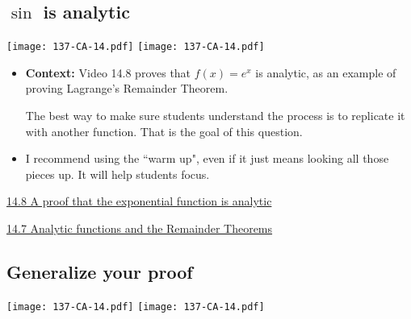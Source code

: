 \documentclass[11pt]{article}
\newcommand{\nl}{\hfill \vspace{-1.1\baselineskip}} %
\newcommand{\vvii}{\hspace{8mm}  \href{https://www.youtube.com/watch?v=SXLJOa1_GMs&list=PLlwePzQY_wW9h32ZwS6CYsY4eR_b2pE9j&index=7}{14.7 Analytic functions and the Remainder Theorems}}
\newcommand{\vviii}{\hspace{8mm}  \href{https://www.youtube.com/watch?v=lQH-pqS7vdk&list=PLlwePzQY_wW9h32ZwS6CYsY4eR_b2pE9j&index=8}{14.8 A proof that the exponential function is analytic}}
\begin{document}
\subsection{$\sin$ is analytic}

\begin{center}
{ \texttt{[image: 137-CA-14.pdf]}} \quad
{ \texttt{[image: 137-CA-14.pdf]}} 
\end{center}

\begin{comments}
\nl
	\begin{itemize}
		\item {\bf Context:}  Video 14.8 proves that $f(x) =e^x$ is analytic, as an example of proving Lagrange's Remainder Theorem.
	
		The best way to make sure students understand the process is to replicate it with another function.  That is the goal of this question.
		
		\item  I recommend using the ``warm up", even if it just means looking all those pieces up. It will help students focus.
	\end{itemize}
\end{comments}

\begin{videos}
\vviii

\vvii
\end{videos}

\newpage
\subsection{Generalize your proof}

\begin{center}
{ \texttt{[image: 137-CA-14.pdf]}} \quad
{ \texttt{[image: 137-CA-14.pdf]}} 
\end{center}
\end{document}
